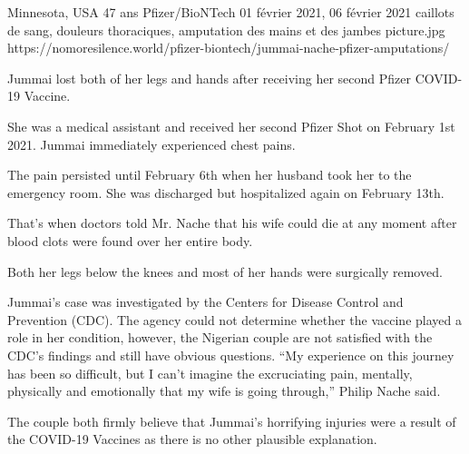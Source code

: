           {Minnesota, USA}
          {47 ans}
          {Pfizer/BioNTech}
          {01 février 2021, 06 février 2021}
          {caillots de sang, douleurs thoraciques, amputation des mains et des jambes}
          {picture.jpg}
          {https://nomoresilence.world/pfizer-biontech/jummai-nache-pfizer-amputations/}
          {           

Jummai lost both of her legs and hands after receiving her second Pfizer
COVID-19 Vaccine.

She was a medical assistant and received her second Pfizer Shot on February 1st
2021. Jummai immediately experienced chest pains.

The pain persisted until February 6th when her husband took her to the emergency
room. She was discharged but hospitalized again on February 13th.

That’s when doctors told Mr. Nache that his wife could die at any moment after
blood clots were found over her entire body.

Both her legs below the knees and most of her hands were surgically removed.

Jummai’s case was investigated by the Centers for Disease Control and Prevention
(CDC). The agency could not determine whether the vaccine played a role in her
condition, however, the Nigerian couple are not satisfied with the CDC’s
findings and still have obvious questions. “My experience on this journey has
been so difficult, but I can’t imagine the excruciating pain, mentally,
physically and emotionally that my wife is going through,” Philip Nache said.

The couple both firmly believe that Jummai’s horrifying injuries were a result
of the COVID-19 Vaccines as there is no other plausible explanation.

}
